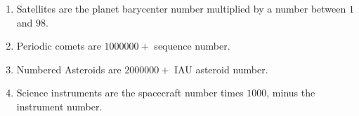 \documentclass[crop=false,class=book]{standalone}
\begin{document}
\begin{enumerate}
\begin{itemize}
\begin{multicols}{3}
    \end{multicols}
    \end{itemize}
    \item Satellites are the planet barycenter number multiplied by a number between $1$ and $98$.
    \begin{itemize}
    \end{itemize}
    \item Periodic comets are $1000000 +$ sequence number.
    \begin{itemize}
    \end{itemize}
    \item Numbered Asteroids are $2000000+$ IAU asteroid number.
    \begin{itemize}
    \end{itemize}
    \item Science instruments are the spacecraft number times $1000$, minus the instrument number.
    \begin{itemize}
    \end{itemize}
\end{enumerate}
\end{document}
